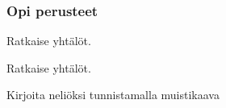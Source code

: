 
\begin{tehtavasivu}

\subsubsection*{Opi perusteet}

\begin{tehtava}
    Ratkaise yhtälöt.
    \begin{alakohdat}

    \end{alakohdat}
    \begin{vastaus}
        \begin{alakohdat}
        \end{alakohdat}
    \end{vastaus}
\end{tehtava}

\begin{tehtava}
    Ratkaise yhtälöt.
    \begin{alakohdat}
    \end{alakohdat}
    \begin{vastaus}
        \begin{alakohdat}
        \end{alakohdat}
    \end{vastaus}
\end{tehtava}

\begin{tehtava}
    Kirjoita neliöksi tunnistamalla muistikaava
    \begin{alakohdat}
    \end{alakohdat}
    \begin{vastaus}
        \begin{alakohdat}
        \end{alakohdat}
    \end{vastaus}
\end{tehtava}


\end{tehtavasivu}

